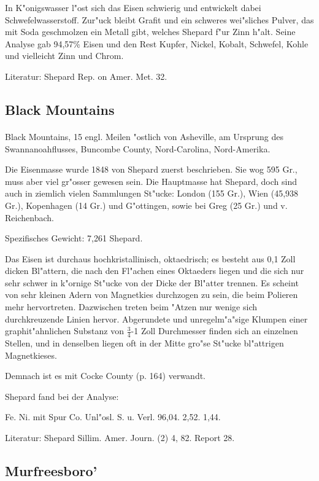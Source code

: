 \documentclass[a4paper, 11pt, oneside]{article}
\begin{document}
In K"onigswasser l"ost sich das Eisen schwierig und entwickelt dabei Schwefelwasserstoff. Zur"uck bleibt Grafit und ein schweres wei"sliches Pulver, das mit Soda geschmolzen ein Metall gibt, welches Shepard f"ur Zinn h"alt. Seine Analyse gab 94,57\% Eisen und den Rest Kupfer, Nickel, Kobalt, Schwefel, Kohle und vielleicht Zinn und Chrom.

Literatur: Shepard Rep. on Amer. Met. 32.

\subsection{Black Mountains}
\normalsize
\paragraph{}
Black Mountains, 15 engl. Meilen "ostlich von Asheville, am Ursprung des Swannanoahflusses, Buncombe County, Nord-Carolina, Nord-Amerika.

Die Eisenmasse wurde 1848 von Shepard zuerst beschrieben. Sie wog 595 Gr., muss aber viel gr"osser gewesen sein. Die Hauptmasse hat Shepard, doch sind auch in ziemlich vielen Sammlungen St"ucke: London (155 Gr.), Wien (45,938 Gr.), Kopenhagen (14 Gr.) und G"ottingen, sowie bei Greg (25 Gr.) und v. Reichenbach.

Spezifisches Gewicht: 7,261 Shepard.

Das Eisen ist durchaus hochkristallinisch, oktaedrisch; es besteht aus 0,1 Zoll dicken Bl"attern, die nach den Fl"achen eines Oktaeders liegen und die sich nur sehr schwer in k"ornige St"ucke von der Dicke der Bl"atter trennen. Es scheint von sehr kleinen Adern von Magnetkies durchzogen zu sein, die beim Polieren mehr hervortreten. Dazwischen treten beim "Atzen nur wenige sich durchkreuzende Linien hervor. Abgerundete und unregelm"a"sige Klumpen einer graphit"ahnlichen Substanz von $\frac{3}{4}$-1 Zoll Durchmesser finden sich an einzelnen Stellen, und in denselben liegen oft in der Mitte gro"se St"ucke bl"attrigen Magnetkieses.

Demnach ist es mit Cocke County (p. 164) verwandt.

Shepard fand bei der Analyse:

Fe. Ni. mit Spur Co. Unl"osl. S. u. Verl.
96,04. 2,52. 1,44.

Literatur: Shepard Sillim. Amer. Journ. (2) 4, 82. Report 28.

\subsection{Murfreesboro'}
\normalsize
\end{document}
